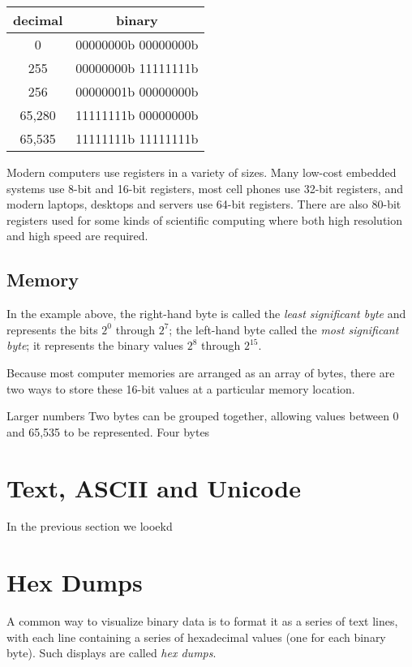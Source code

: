 \begin{tabular}{cc}
decimal & binary \\
\hline
0      & 00000000b 00000000b \\
255    & 00000000b 11111111b \\
256    & 00000001b 00000000b \\
65,280 & 11111111b 00000000b \\
65,535 & 11111111b 11111111b \\
\hline
\end{tabular}

Modern computers use registers in a variety of sizes. Many low-cost
embedded systems use 8-bit and 16-bit registers, most cell phones use
32-bit registers, and modern laptops, desktops and servers use
64-bit registers. There are also 80-bit registers used for some kinds
of scientific computing where both high resolution and high speed are required.

\subsection{Memory}

In the example above, the right-hand byte is called the \emph{least
  significant byte} and represents the bits $2^0$ through $2^7$; the
left-hand byte  called the \emph{most
significant byte}; it represents the binary values $2^8$ through
$2^{15}$. 


Because most computer memories are arranged as an array of bytes,
there are two ways to store these 16-bit values at a particular memory
location. 



Larger numbers Two bytes can be grouped together, allowing values between 0 and
65,535 to be represented. Four bytes


\section{Text, ASCII and Unicode}\label{sec:letters}

In the previous section we looekd 

\section{Hex Dumps}\label{sec:hex-dumps}
A common way to visualize binary data is to format it as a series of
text lines, with each line containing a series of hexadecimal values (one
for each binary byte). Such displays are called \emph{hex
  dumps}.

